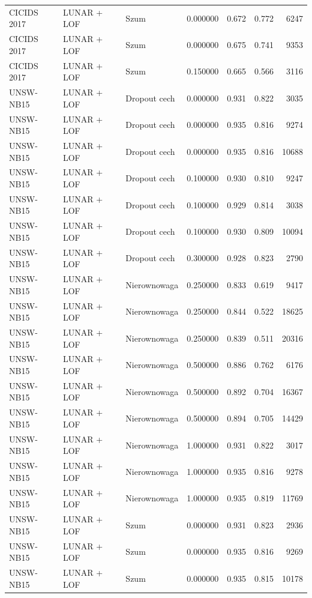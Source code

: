 \begin{table}
\begin{tabular}{lllrllr}
CICIDS 2017 & LUNAR + LOF & Szum & 0.000000 & 0.672 & 0.772 & 6247 \\
CICIDS 2017 & LUNAR + LOF & Szum & 0.000000 & 0.675 & 0.741 & 9353 \\
CICIDS 2017 & LUNAR + LOF & Szum & 0.150000 & 0.665 & 0.566 & 3116 \\
UNSW-NB15 & LUNAR + LOF & Dropout cech & 0.000000 & 0.931 & 0.822 & 3035 \\
UNSW-NB15 & LUNAR + LOF & Dropout cech & 0.000000 & 0.935 & 0.816 & 9274 \\
UNSW-NB15 & LUNAR + LOF & Dropout cech & 0.000000 & 0.935 & 0.816 & 10688 \\
UNSW-NB15 & LUNAR + LOF & Dropout cech & 0.100000 & 0.930 & 0.810 & 9247 \\
UNSW-NB15 & LUNAR + LOF & Dropout cech & 0.100000 & 0.929 & 0.814 & 3038 \\
UNSW-NB15 & LUNAR + LOF & Dropout cech & 0.100000 & 0.930 & 0.809 & 10094 \\
UNSW-NB15 & LUNAR + LOF & Dropout cech & 0.300000 & 0.928 & 0.823 & 2790 \\
UNSW-NB15 & LUNAR + LOF & Nierownowaga & 0.250000 & 0.833 & 0.619 & 9417 \\
UNSW-NB15 & LUNAR + LOF & Nierownowaga & 0.250000 & 0.844 & 0.522 & 18625 \\
UNSW-NB15 & LUNAR + LOF & Nierownowaga & 0.250000 & 0.839 & 0.511 & 20316 \\
UNSW-NB15 & LUNAR + LOF & Nierownowaga & 0.500000 & 0.886 & 0.762 & 6176 \\
UNSW-NB15 & LUNAR + LOF & Nierownowaga & 0.500000 & 0.892 & 0.704 & 16367 \\
UNSW-NB15 & LUNAR + LOF & Nierownowaga & 0.500000 & 0.894 & 0.705 & 14429 \\
UNSW-NB15 & LUNAR + LOF & Nierownowaga & 1.000000 & 0.931 & 0.822 & 3017 \\
UNSW-NB15 & LUNAR + LOF & Nierownowaga & 1.000000 & 0.935 & 0.816 & 9278 \\
UNSW-NB15 & LUNAR + LOF & Nierownowaga & 1.000000 & 0.935 & 0.819 & 11769 \\
UNSW-NB15 & LUNAR + LOF & Szum & 0.000000 & 0.931 & 0.823 & 2936 \\
UNSW-NB15 & LUNAR + LOF & Szum & 0.000000 & 0.935 & 0.816 & 9269 \\
UNSW-NB15 & LUNAR + LOF & Szum & 0.000000 & 0.935 & 0.815 & 10178 \\
\bottomrule
\end{tabular}
\end{table}
